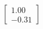 \documentclass[preview]{standalone}
\begin{document}
\begin{align*}
\begin{bmatrix} 1.00 \\ -0.31 \end{bmatrix}
\end{align*}
\end{document}
